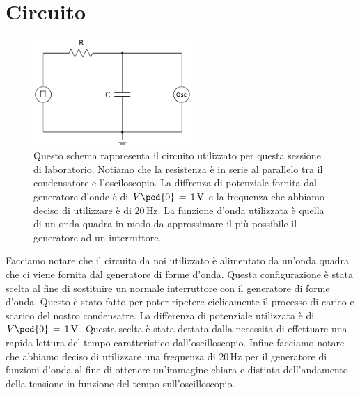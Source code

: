 \section*{Circuito}

\begin{figure}
    \includegraphics[width=60mm]{schema.pdf}
    \caption{Questo schema rappresenta il circuito utilizzato per questa sessione di laboratorio. Notiamo che la resistenza è in serie al parallelo tra il condensatore e l'osciloscopio. La diffrenza di potenziale fornita dal generatore d'onde è di $V\ped{0} \,=\, 1\,\si{\volt}$ e la frequenza che abbiamo deciso di utilizzare è di $20\,\si{\hertz}$. La funzione d'onda utilizzata è quella di un onda quadra in modo da approssimare il più possibile il generatore ad un interruttore.}
\end{figure}

Facciamo notare che il circuito da noi utilizzato è alimentato da un'onda quadra che ci viene fornita dal generatore di forme d'onda. Questa configurazione è stata scelta al fine di sostituire un normale interruttore con il generatore di forme d'onda. Questo è stato fatto per poter ripetere ciclicamente il processo di carico e scarico del nostro condensatre.
La differenza di potenziale utilizzata è di $V\ped{0} \,=\, 1\,\si{\volt}$. Questa scelta è stata dettata dalla necessita di effettuare una rapida lettura del tempo caratteristico dall'oscilloscopio. Infine facciamo notare che abbiamo deciso di utilizzare una frequenza di $20\,\si{\hertz}$ per il generatore di funzioni d'onda al fine di ottenere un'immagine chiara e distinta dell'andamento della tensione in funzione del tempo sull'oscilloscopio.